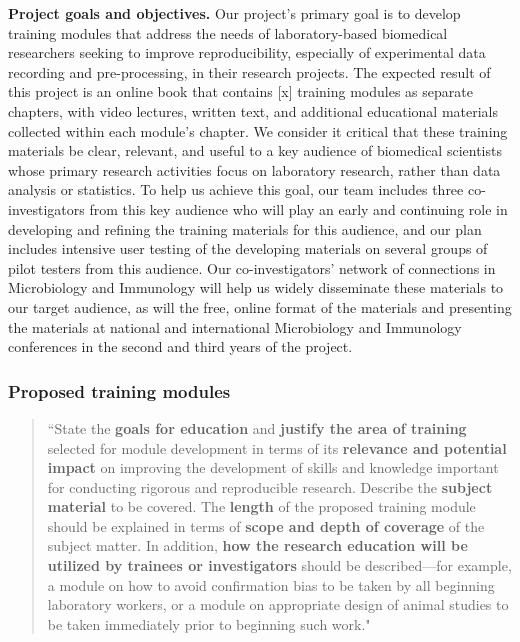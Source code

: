 \documentclass[pdftex,english,11pt,parskip=half]{scrartcl}
\begin{document}
\textbf{Project goals and objectives.} Our project's primary goal is to develop training modules that address the needs of laboratory-based biomedical researchers seeking to improve reproducibility, especially of experimental data recording and pre-processing, in their research projects. The expected result of this project is an online book that contains [x] training modules as separate chapters, with video lectures, written text, and additional educational materials collected within each module's chapter. We consider it critical that these training materials be clear, relevant, and useful to a key audience of biomedical scientists whose primary research activities focus on laboratory research, rather than data analysis or statistics. To help us achieve this goal, our team includes three co-investigators from this key audience who will play an early and continuing role in developing and refining the training materials for this audience, and our plan includes intensive user testing of the developing materials on several groups of pilot testers from this audience. Our co-investigators' network of connections in Microbiology and Immunology will help us widely disseminate these materials to our target audience, as will the free, online format of the materials and presenting the materials at national and international Microbiology and Immunology conferences in the second and third years of the project.

\subsubsection*{Proposed training modules}

\begin{quotation}
``State the \textbf{goals for education} and \textbf{justify the area of training} selected for module development in terms of its \textbf{relevance and potential impact} on improving the development of skills and knowledge important for conducting rigorous and reproducible research. Describe the \textbf{subject material} to be covered. The \textbf{length} of the proposed training module should be explained in terms of \textbf{scope and depth of coverage} of the subject matter.  In addition, \textbf{how the research education will be utilized by trainees or investigators} should be described---for example, a module on how to avoid confirmation bias to be taken by all beginning laboratory workers, or a module on appropriate design of animal studies to be taken immediately prior to beginning such work."
\end{quotation}
\end{document}
